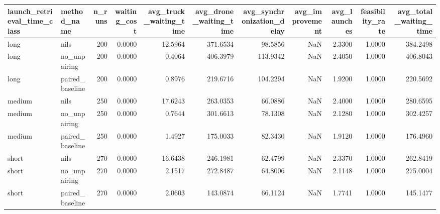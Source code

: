 \begin{tabular}{llrrrrrrrrr}
\toprule
launch_retrieval_time_class & method_name & n_runs & waiting_cost & avg_truck_waiting_time & avg_drone_waiting_time & avg_synchronization_delay & avg_improvement & avg_launches & feasibility_rate & avg_total_waiting_time \\
\midrule
long & nils & 200 & 0.0000 & 12.5964 & 371.6534 & 98.5856 & NaN & 2.3300 & 1.0000 & 384.2498 \\
long & no_unpairing & 200 & 0.0000 & 0.4064 & 406.3979 & 113.9342 & NaN & 2.4050 & 1.0000 & 406.8043 \\
long & paired_baseline & 200 & 0.0000 & 0.8976 & 219.6716 & 104.2294 & NaN & 1.9200 & 1.0000 & 220.5692 \\
medium & nils & 250 & 0.0000 & 17.6243 & 263.0353 & 66.0886 & NaN & 2.4000 & 1.0000 & 280.6595 \\
medium & no_unpairing & 250 & 0.0000 & 0.7644 & 301.6613 & 78.1308 & NaN & 2.1280 & 1.0000 & 302.4257 \\
medium & paired_baseline & 250 & 0.0000 & 1.4927 & 175.0033 & 82.3430 & NaN & 1.9120 & 1.0000 & 176.4960 \\
short & nils & 270 & 0.0000 & 16.6438 & 246.1981 & 62.4799 & NaN & 2.3370 & 1.0000 & 262.8419 \\
short & no_unpairing & 270 & 0.0000 & 2.1517 & 272.8487 & 64.8006 & NaN & 2.1148 & 1.0000 & 275.0004 \\
short & paired_baseline & 270 & 0.0000 & 2.0603 & 143.0874 & 66.1124 & NaN & 1.7741 & 1.0000 & 145.1477 \\
\bottomrule
\end{tabular}
